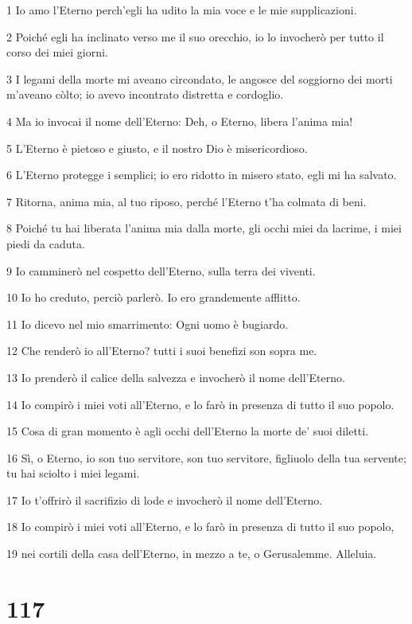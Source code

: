 \par 1 Io amo l'Eterno perch'egli ha udito la mia voce e le mie supplicazioni.
\par 2 Poiché egli ha inclinato verso me il suo orecchio, io lo invocherò per tutto il corso dei miei giorni.
\par 3 I legami della morte mi aveano circondato, le angosce del soggiorno dei morti m'aveano còlto; io avevo incontrato distretta e cordoglio.
\par 4 Ma io invocai il nome dell'Eterno: Deh, o Eterno, libera l'anima mia!
\par 5 L'Eterno è pietoso e giusto, e il nostro Dio è misericordioso.
\par 6 L'Eterno protegge i semplici; io ero ridotto in misero stato, egli mi ha salvato.
\par 7 Ritorna, anima mia, al tuo riposo, perché l'Eterno t'ha colmata di beni.
\par 8 Poiché tu hai liberata l'anima mia dalla morte, gli occhi miei da lacrime, i miei piedi da caduta.
\par 9 Io camminerò nel cospetto dell'Eterno, sulla terra dei viventi.
\par 10 Io ho creduto, perciò parlerò. Io ero grandemente afflitto.
\par 11 Io dicevo nel mio smarrimento: Ogni uomo è bugiardo.
\par 12 Che renderò io all'Eterno? tutti i suoi benefizi son sopra me.
\par 13 Io prenderò il calice della salvezza e invocherò il nome dell'Eterno.
\par 14 Io compirò i miei voti all'Eterno, e lo farò in presenza di tutto il suo popolo.
\par 15 Cosa di gran momento è agli occhi dell'Eterno la morte de' suoi diletti.
\par 16 Sì, o Eterno, io son tuo servitore, son tuo servitore, figliuolo della tua servente; tu hai sciolto i miei legami.
\par 17 Io t'offrirò il sacrifizio di lode e invocherò il nome dell'Eterno.
\par 18 Io compirò i miei voti all'Eterno, e lo farò in presenza di tutto il suo popolo,
\par 19 nei cortili della casa dell'Eterno, in mezzo a te, o Gerusalemme. Alleluia.

\chapter{117}

